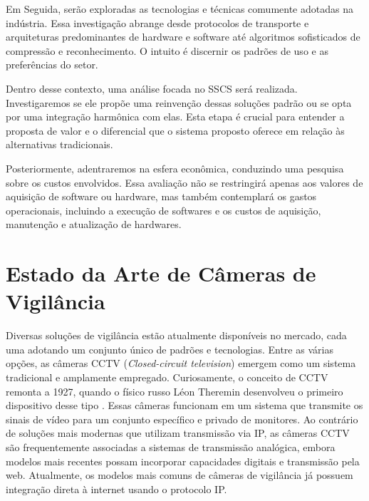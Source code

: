 \documentclass[12pt, %
openright, 
oneside, %
a4paper,    %
brazil]{facom-ufu-abntex2}
\begin{document}
Em Seguida, serão exploradas as tecnologias e técnicas comumente adotadas na
indústria. Essa investigação abrange desde protocolos de transporte e
arquiteturas predominantes de hardware e software até algoritmos sofisticados
de compressão e reconhecimento. O intuito é discernir os padrões de uso e as
preferências do setor.

Dentro desse contexto, uma análise focada no SSCS será realizada.
Investigaremos se ele propõe uma reinvenção dessas soluções padrão ou se opta
por uma integração harmônica com elas. Esta etapa é crucial para entender a
proposta de valor e o diferencial que o sistema proposto oferece em relação às
alternativas tradicionais.

Posteriormente, adentraremos na esfera econômica, conduzindo uma pesquisa sobre
os custos envolvidos. Essa avaliação não se restringirá apenas aos valores de
aquisição de software ou hardware, mas também contemplará os gastos
operacionais, incluindo a execução de softwares e os custos de aquisição,
manutenção e atualização de hardwares.

\section{Estado da Arte de Câmeras de Vigilância}

Diversas soluções de vigilância estão atualmente disponíveis no mercado, cada
uma adotando um conjunto único de padrões e tecnologias. Entre as várias
opções, as câmeras CCTV (\textit{\foreignlanguage{english}{Closed-circuit
		television}}) emergem como um sistema tradicional e amplamente empregado.
Curiosamente, o conceito de CCTV remonta a 1927, quando o físico russo Léon
Theremin desenvolveu o primeiro dispositivo desse tipo
\cite{glinsky2000theremin}. Essas câmeras funcionam em um sistema que transmite
os sinais de vídeo para um conjunto específico e privado de monitores. Ao
contrário de soluções mais modernas que utilizam transmissão via IP, as câmeras
CCTV são frequentemente associadas a sistemas de transmissão analógica, embora
modelos mais recentes possam incorporar capacidades digitais e transmissão pela
web. Atualmente, os modelos mais comuns de câmeras de vigilância já possuem
integração direta à internet usando o protocolo IP.
\end{document}

